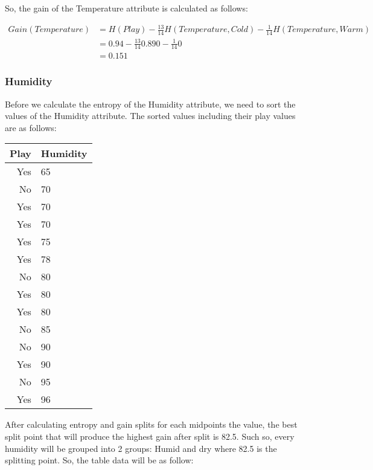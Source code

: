 \documentclass[
  11pt, %
]{assignment}
\begin{document}
So, the gain of the Temperature attribute is calculated as follows:

\begin{equation}
	\label{eq:gain-temp}
	\begin{split}
		Gain(Temperature) &= H(Play) - \frac{13}{14} H(Temperature, Cold) - \frac{1}{14} H(Temperature, Warm) \\
		&= 0.94 - \frac{13}{14} 0.890 - \frac{1}{14} 0 \\
		&= 0.151
	\end{split}
\end{equation}


\subsubsection*{Humidity}

Before we calculate the entropy of the Humidity attribute, we need to sort the values of the Humidity attribute. The sorted values including their play values are as follows:

\begin{center}
	\begin{tabular}{r | l}
		Play & Humidity \\
		\toprule
		Yes  & 65       \\
		No   & 70       \\
		Yes  & 70       \\
		Yes  & 70       \\
		Yes  & 75       \\
		Yes  & 78       \\
		No   & 80       \\
		Yes  & 80       \\
		Yes  & 80       \\
		No   & 85       \\
		No   & 90       \\
		Yes  & 90       \\
		No   & 95       \\
		Yes  & 96       \\
	\end{tabular}
\end{center}

After calculating entropy and gain splits for each midpoints the value, the best split point that will produce the highest gain after split is 82.5. Such so, every humidity will be grouped into 2 groups: Humid and dry where 82.5 is the splitting point. So, the table data will be as follow:
\end{document}
